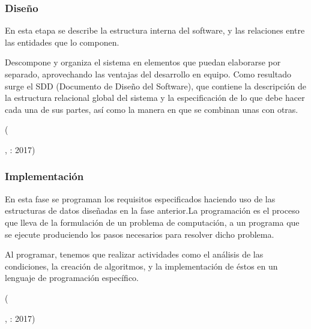             \subsubsection{Diseño}
            \begin{center}
              \begin{minipage}{0.9\linewidth}
                \vspace{5pt}%
                {\small
                En esta etapa se describe la estructura interna del software, y las relaciones entre las entidades que lo componen.

                Descompone y organiza el sistema en elementos que puedan elaborarse por separado, aprovechando las ventajas del desarrollo en equipo. Como resultado surge el SDD (Documento de Diseño del Software), que contiene la descripción de la estructura relacional global del sistema y la especificación de lo que debe hacer cada una de sus partes, así como la manera en que se combinan unas con otras.
                }
                \begin{flushright}
                  (\author{En qué consiste el modelo en cascada.},
                  : 2017)
                \end{flushright}
                  \vspace{5pt}%
              \end{minipage}
            \end{center}
            \subsubsection{Implementación}
            \begin{center}
              \begin{minipage}{0.9\linewidth}
                \vspace{5pt}%
                {\small

                En esta fase se programan los requisitos especificados haciendo uso de las estructuras de datos diseñadas en la fase anterior.La programación es el proceso que lleva de la formulación de un problema de computación, a un programa que se ejecute produciendo los pasos necesarios para resolver dicho problema.

                Al programar, tenemos que realizar actividades como el análisis de las condiciones, la creación de algoritmos,  y la implementación de éstos en un lenguaje de programación específico.
                }
                \begin{flushright}
                  (\author{En qué consiste el modelo en cascada.},
                  : 2017)
                \end{flushright}
                  \vspace{5pt}%
              \end{minipage}
            \end{center}
